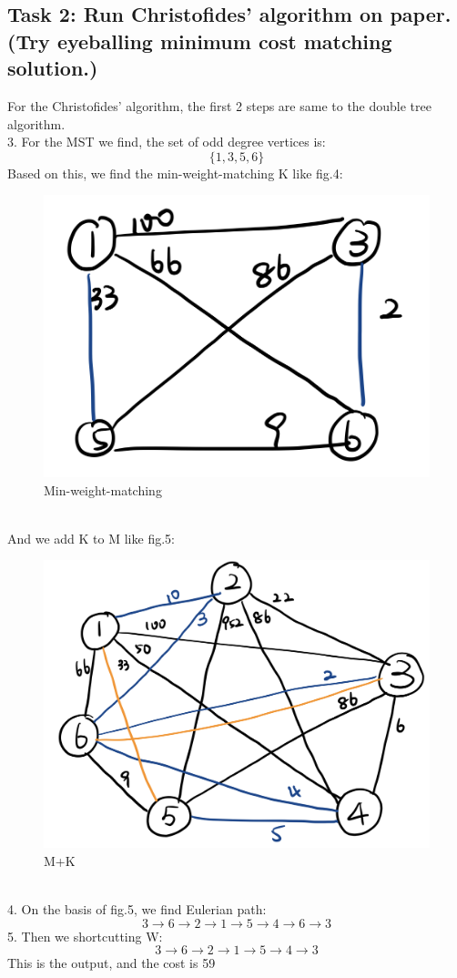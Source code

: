 \documentclass[a4paper,12pt]{journal}
\begin{document}
		\subsection*{Task 2: Run Christofides’ algorithm on paper. (Try eyeballing minimum cost matching solution.)}
		For the Christofides’ algorithm, the first 2 steps are same to the double tree algorithm. \\
		3. For the MST we find, the set of odd degree vertices is:\\
		$$\{1,3,5,6\}$$
		Based on this, we find the min-weight-matching K like fig.4:\\
		\begin{figure}[h]
			\includegraphics[scale=0.5]{./image/4.png}
			\caption{Min-weight-matching }
		\end{figure}\\
	And we add K to M like fig.5:\\
	\begin{figure}[h]
		\includegraphics[scale=0.3]{./image/5.png}
		\caption{M+K }
	\end{figure}\\
	4. On the basis of fig.5, we find Eulerian path:
	$$3\rightarrow6\rightarrow2\rightarrow1\rightarrow5\rightarrow4\rightarrow6\rightarrow3$$
	5. Then we shortcutting W:
	$$3\rightarrow6\rightarrow2\rightarrow1\rightarrow5\rightarrow4\rightarrow3$$
	This is the output, and the cost is 59
\end{document}
